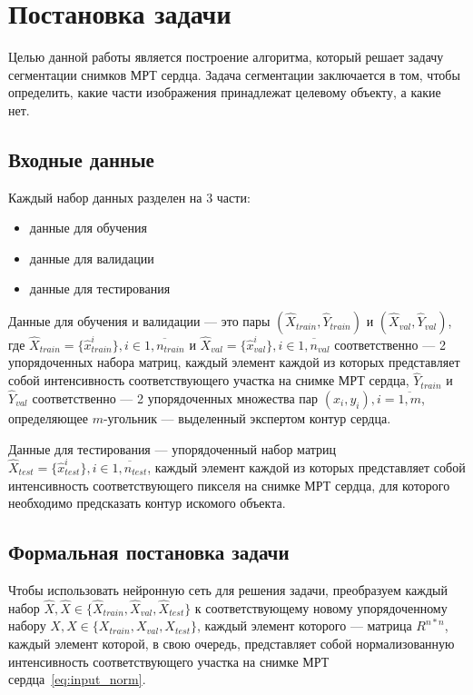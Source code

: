 \section{Постановка задачи}

Целью данной работы является построение алгоритма, который решает задачу сегментации снимков МРТ сердца. Задача сегментации заключается в том, чтобы определить, какие части изображения принадлежат целевому объекту, а какие нет. 

\subsection{Входные данные}

Каждый набор данных разделен на 3 части: 

\begin{itemize}
  \item данные для обучения
  \item данные для валидации
  \item данные для тестирования
\end{itemize}

Данные для обучения и валидации — это пары $(\hat{X}_{train},\hat{Y}_{train})$ и $(\hat{X}_{val},\hat{Y}_{val})$, где $\hat{X}_{train} = \{\hat{x}_{train}^{i}\}, i\in{}\overline{1,n_{train}}$ и $\hat{X}_{val} = \{\hat{x}_{val}^{i}\}, i\in{}\overline{1,n_{val}}$ соответственно — 2 упорядоченных набора матриц, каждый элемент каждой из которых представляет собой интенсивность соответствующего участка на снимке МРТ сердца, $\hat{Y}_{train}$ и $\hat{Y}_{val}$ соответственно — 2 упорядоченных множества пар $(x_{i},y_{i}), i = \overline{1,m}$, определяющее \mbox{$m$-угольник} — выделенный экспертом контур сердца.

Данные для тестирования — упорядоченный набор матриц $\hat{X}_{test} = \{\hat{x}_{test}^{i}\}, i\in{}\overline{1,n_{test}}$, каждый элемент каждой из которых представляет собой интенсивность соответствующего пикселя на снимке МРТ сердца, для которого необходимо предсказать контур искомого объекта.

\subsection{Формальная постановка задачи}

Чтобы использовать нейронную сеть для решения задачи, преобразуем каждый набор $\hat{X},\hat{X}\in{}\{\hat{X}_{train},\hat{X}_{val},\hat{X}_{test}\}$ к соответствующему новому упорядоченному набору $X,X\in{}\{X_{train},X_{val},X_{test}\}$, каждый элемент которого — матрица $R^{n*n}$, каждый элемент которой, в свою очередь, представляет собой нормализованную интенсивность соответствующего участка на снимке МРТ сердца~\ref{eq:input_norm}. 

